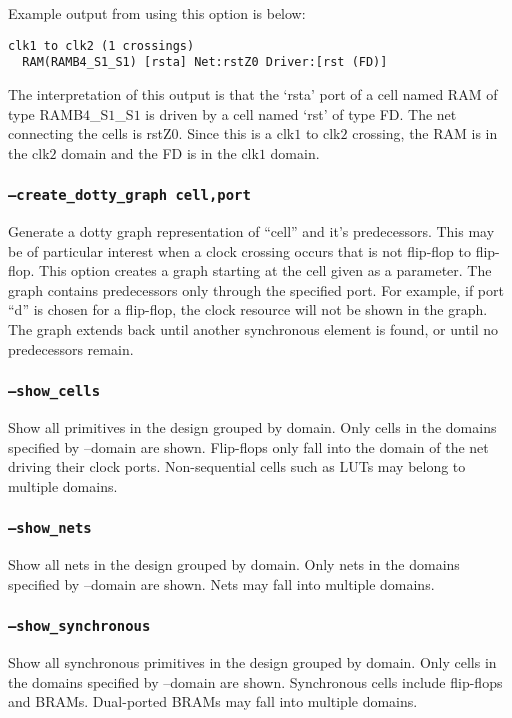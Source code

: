 Example output from using this option is below:
\begin{verbatim}
clk1 to clk2 (1 crossings)
  RAM(RAMB4_S1_S1) [rsta] Net:rstZ0 Driver:[rst (FD)]
\end{verbatim}
The interpretation of this output is that the `rsta' port of a cell named RAM of
type RAMB$4$\_S$1$\_S$1$ is driven by a cell named `rst' of type FD.  The net
connecting the cells is rstZ$0$. Since this is a clk$1$ to clk$2$ crossing, the
RAM is in the clk$2$ domain and the FD is in the clk$1$ domain.

\subsubsection{\texttt{--create\_dotty\_graph cell,port}}
Generate a dotty graph representation of ``cell'' and it's predecessors.  This
may be of particular interest when a clock crossing occurs that is not flip-flop
to flip-flop. This option creates a graph starting at the cell given as a
parameter.  The graph contains predecessors only through the specified port. 
For example, if port ``d'' is chosen for a flip-flop, the clock resource will
not be shown in the graph.  The graph extends back until another synchronous
element is found, or until no predecessors remain.

\subsubsection{\texttt{--show\_cells}}
Show all primitives in the design grouped by domain. Only cells in the domains
specified by --domain are shown. Flip-flops only fall into the domain of the net
driving their clock ports.  Non-sequential cells such as LUTs may belong to
multiple domains.

\subsubsection{\texttt{--show\_nets}}
Show all nets in the design grouped by domain. Only nets in the domains 
specified by --domain are shown. Nets may fall into multiple domains.

\subsubsection{\texttt{--show\_synchronous}}
Show all synchronous primitives in the design grouped by domain. Only cells in
the domains specified by --domain are shown. Synchronous cells include
flip-flops and BRAMs.  Dual-ported BRAMs may fall into multiple domains.


